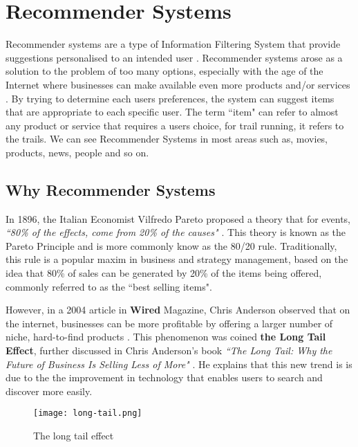 \section{Recommender Systems} \label{sec:RecSystems}
Recommender systems are a type of Information Filtering System that provide suggestions personalised to an intended user \cite{ricci2011introduction}.  Recommender systems arose as a solution to the problem of too many options, especially with the age of the Internet where businesses can make available even more products and/or services \cite{rishabh2019recommender}.  By trying to determine each users preferences, the system can suggest items that are appropriate to each specific user.  The term ``item" can refer to almost any product or service that requires a users choice, for trail running, it refers to the trails. We can see  Recommender Systems in most areas such as,  movies,  products, news, people and so on.

\subsection{Why Recommender Systems} \label{subsec:WhyRecSystems}
In 1896, the Italian Economist Vilfredo Pareto proposed a theory that for events, \textit{``80\% of the effects, come from 20\% of the causes" \cite{sanders1987pareto}}. This theory is known as the Pareto Principle and is more commonly know as the 80/20 rule. Traditionally, this rule is a popular maxim in business and strategy management, based on the idea that 80\% of sales can be generated by 20\% of the items being offered, commonly referred to as the ``best selling items".

However, in a 2004 article in \textbf{Wired} Magazine, Chris Anderson observed that on the internet, businesses can be more profitable by offering a larger number of niche, hard-to-find products \cite{brynjolfsson2011goodbye}. This phenomenon was coined \textbf{the Long Tail Effect}, further discussed in Chris Anderson's book \textit{``The Long Tail: Why the Future of Business Is Selling Less of More"} \cite{anderson2006long}. He explains that this new trend is is due to the the improvement in technology that enables users to search and discover more easily. 

\begin{figure}[htb!]
    \centering
    \texttt{[image: long-tail.png]}
    \caption{The long tail effect \cite{longtaileffect}}
    \label{fig:longtail}
\end{figure}

